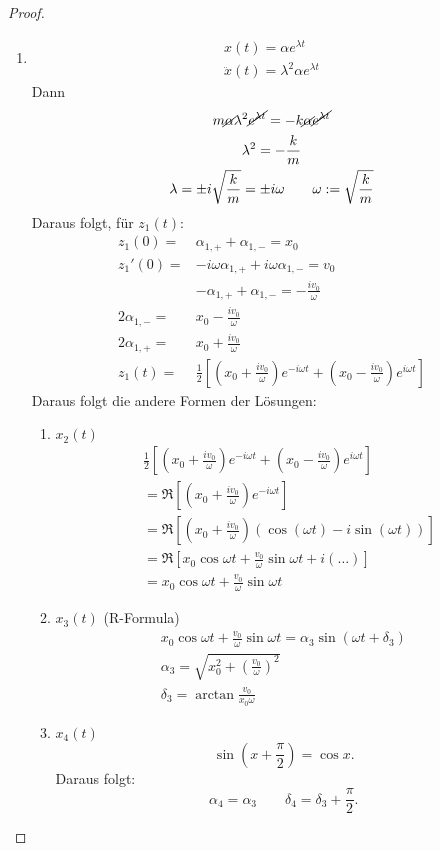 \documentclass[prb,12pt]{revtex4-2}
\theoremstyle{definition}
\theoremstyle{definition}
\begin{document}
\begin{proof}
\begin{enumerate}
		\item 
			\begin{gather*}
				x(t)=\alpha e^{\lambda t}\\
				\ddot{x}(t)=\lambda^2 \alpha e^{\lambda t}
			\end{gather*}
			Dann
			\begin{gather*}
				m\cancel\alpha\lambda^2 \cancel{e^{\lambda t}}=-k\cancel\alpha \cancel{e^{\lambda t}}\\
				\lambda^2=-\frac{k}{m}\\
				\lambda=\pm i\sqrt{\frac{k}{m}}=\pm i\omega \qquad \omega :=\sqrt{\frac{k}{m}}    
			\end{gather*}
			Daraus folgt, f\"{u}r $z_1(t)$:
\begin{align*}
	z_1(0)=&\alpha_{1,+}+\alpha_{1,-}=x_0\\
	z_1'(0)=&-i\omega \alpha_{1,+}+i\omega \alpha_{1,-}=v_0\\
		&-\alpha_{1,+}+\alpha_{1,-}=-\frac{iv_0}{\omega}\\
	2\alpha_{1,-}=&x_0-\frac{iv_0}{\omega}\\
	2\alpha_{1,+}=&x_0+\frac{iv_0}{\omega}\\
	z_1(t)=& \frac{1}{2}\left[ \left( x_0+\frac{iv_0}{\omega} \right) e^{-i\omega t}+\left( x_0-\frac{iv_0}{\omega} \right) e^{i\omega t} \right] 
\end{align*}
Daraus folgt die andere Formen der L\"{o}sungen:
\begin{enumerate}[label=(\roman*)]
	\item $x_2(t)$ 
		\begin{align*}
			&\frac{1}{2}\left[ \left( x_0+\frac{iv_0}{\omega} \right)e^{-i\omega t}+\left( x_0-\frac{iv_0}{\omega} \right) e^{i\omega t}  \right] \\
			&= \Re\left[ \left( x_0+\frac{iv_0}{\omega} \right) e^{-i\omega t} \right] \\
			&=\Re\left[ \left( x_0+\frac{iv_0}{\omega} \right) \left( \cos(\omega t)-i\sin(\omega t) \right)  \right] \\
			&=\Re\left[ x_0\cos\omega t+\frac{v_0}{\omega}\sin\omega t+i(\dots) \right] \\
			&= x_0\cos\omega t+\frac{v_0}{\omega}\sin\omega t
		\end{align*}
	\item $x_3(t)$ 
		(R-Formula)
		\begin{gather*}
			x_0\cos\omega t+\frac{v_0}{\omega}\sin\omega t=\alpha_3 \sin(\omega t+\delta_3)\\
			\alpha_3=\sqrt{x_0^2+\left( \frac{v_0}{\omega} \right) ^2} \\
			\delta_3=\arctan \frac{v_0}{x_0\omega}
		\end{gather*}
	\item $x_4(t)$ 
		\[
		\sin\left( x+\frac{\pi}{2} \right) =\cos x
		.\] 
		Daraus folgt:
		\[
		\alpha_4=\alpha_3 \qquad \delta_4=\delta_3+\frac{\pi}{2}
		.\] 
\end{enumerate}
	\end{enumerate}
\end{proof}
\end{document}
